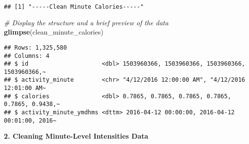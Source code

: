 \documentclass[
]{article}
\newenvironment{Shaded}{\begin{snugshade}}{\end{snugshade}}
\newcommand{\AttributeTok}[1]{\textcolor[rgb]{0.13,0.29,0.53}{#1}}
\newcommand{\CommentTok}[1]{\textcolor[rgb]{0.56,0.35,0.01}{\textit{#1}}}
\newcommand{\FunctionTok}[1]{\textcolor[rgb]{0.13,0.29,0.53}{\textbf{#1}}}
\newcommand{\NormalTok}[1]{#1}
\newcommand{\OtherTok}[1]{\textcolor[rgb]{0.56,0.35,0.01}{#1}}
\newcommand{\SpecialCharTok}[1]{\textcolor[rgb]{0.81,0.36,0.00}{\textbf{#1}}}
\newcommand{\StringTok}[1]{\textcolor[rgb]{0.31,0.60,0.02}{#1}}
\begin{document}
\begin{Shaded}
\end{Shaded}

\begin{verbatim}
## [1] "-----Clean Minute Calories-----"
\end{verbatim}

\begin{Shaded}
\begin{Highlighting}[]
\CommentTok{\# Display the structure and a brief preview of the data}
\FunctionTok{glimpse}\NormalTok{(clean\_minute\_calories)}
\end{Highlighting}
\end{Shaded}

\begin{verbatim}
## Rows: 1,325,580
## Columns: 4
## $ id                     <dbl> 1503960366, 1503960366, 1503960366, 1503960366,~
## $ activity_minute        <chr> "4/12/2016 12:00:00 AM", "4/12/2016 12:01:00 AM~
## $ calories               <dbl> 0.7865, 0.7865, 0.7865, 0.7865, 0.7865, 0.9438,~
## $ activity_minute_ymdhms <dttm> 2016-04-12 00:00:00, 2016-04-12 00:01:00, 2016~
\end{verbatim}

\textbf{2. Cleaning Minute-Level Intensities Data}
\end{document}
